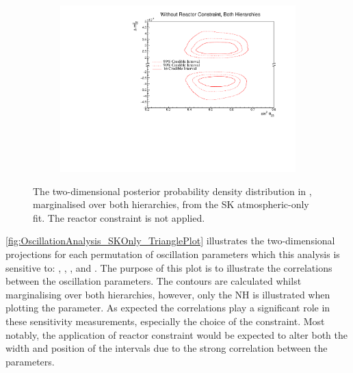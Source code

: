 \begin{figure}[h]
  \begin{subfigure}[t]{0.98\textwidth}
    \includegraphics[width=\textwidth, trim={0mm 0mm 0mm 0mm}, clip,page=1]{Figures/OA/SKOnlyFit/Contours_2D_th23_dm32_BH_0_woRC_UnSmeared_CredibleInterval.pdf}
  \end{subfigure}
  \caption{The two-dimensional posterior probability density distribution in , marginalised over both hierarchies, from the SK atmospheric-only fit. The reactor constraint is not applied.}
  \label{fig:OscillationAnalysis_SKOnly_DM32TH23}
\end{figure}

\autoref{fig:OscillationAnalysis_SKOnly_TrianglePlot} illustrates the two-dimensional projections for each permutation of oscillation parameters which this analysis is sensitive to: , , , and . The purpose of this plot is to illustrate the correlations between the oscillation parameters. The contours are calculated whilst marginalising over both hierarchies, however, only the NH is illustrated when plotting the  parameter. As expected the correlations play a significant role in these sensitivity measurements, especially the choice of the  constraint. Most notably, the application of reactor constraint would be expected to alter both the width and position of the  intervals due to the strong correlation between the parameters.

